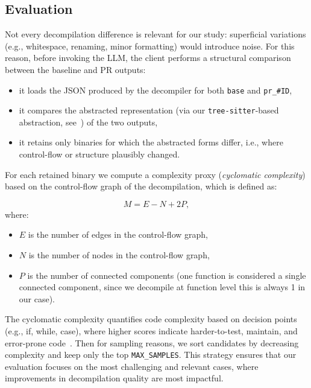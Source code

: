 \subsection{Evaluation}

Not every decompilation difference is relevant for our study: superficial variations (e.g., whitespace, renaming, minor formatting) would introduce noise. For this reason, before invoking the \ac{LLM}, the client performs a structural comparison between the baseline and \ac{PR} outputs:
\begin{itemize}
    \item it loads the \ac{JSON} produced by the decompiler for both \texttt{base} and \texttt{pr\_\#ID},
    \item it compares the abstracted representation (via our \texttt{tree-sitter}-based abstraction, see~) of the two outputs,
    \item it retains only binaries for which the abstracted forms differ, i.e., where control-flow or structure plausibly changed.
\end{itemize}
For each retained binary we compute a complexity proxy (\emph{cyclomatic complexity}) based on the control-flow graph of the decompilation, which is defined as:

\[
M = E - N + 2P,
\]
where:
\begin{itemize}
    \item $E$ is the number of edges in the control-flow graph,
    \item $N$ is the number of nodes in the control-flow graph,
    \item $P$ is the number of connected components (one function is considered a single connected component, since we decompile at function level this is always 1 in our case).
\end{itemize}

The cyclomatic complexity quantifies code complexity based on decision points (e.g., if, while, case), where higher scores indicate harder-to-test, maintain, and error-prone code~\cite{site:sonarsourceCyclomaticComplexity}.
Then for sampling reasons, we sort candidates by decreasing complexity and keep only the top \texttt{MAX\_SAMPLES}. This strategy ensures that our evaluation focuses on the most challenging and relevant cases, where improvements in decompilation quality are most impactful.
